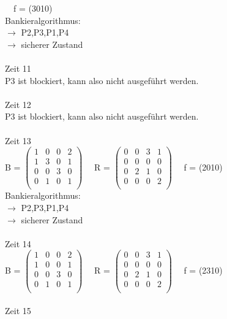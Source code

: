 \documentclass[10pt,a4paper]{scrartcl}
\begin{document}
	\ \ f = (3010)\\
	Bankieralgorithmus:\\
	$\rightarrow$ P2,P3,P1,P4\\
	$\rightarrow$ sicherer Zustand
	\\\\Zeit 11\\
	P3 ist blockiert, kann also nicht ausgeführt werden.
	\\\\Zeit 12\\
	P3 ist blockiert, kann also nicht ausgeführt werden.
	\\\\Zeit 13\\
	B =
	$\left( \begin{array}{rrrr}
	1 & 0 & 0 & 2 \\
	1 & 3 & 0 & 1 \\
	0 & 0 & 3 & 0 \\
	0 & 1 & 0 & 1 \\
	\end{array}\right) $
	\ \ R =
	$\left( \begin{array}{rrrr}
	0 & 0 & 3 & 1 \\
	0 & 0 & 0 & 0 \\
	0 & 2 & 1 & 0 \\
	0 & 0 & 0 & 2 \\
	\end{array}\right) $ 
	\ \ f = (2010)\\
	Bankieralgorithmus:\\
	$\rightarrow$ P2,P3,P1,P4\\
	$\rightarrow$ sicherer Zustand
	\\\\Zeit 14\\
	B =
	$\left( \begin{array}{rrrr}
	1 & 0 & 0 & 2 \\
	1 & 0 & 0 & 1 \\
	0 & 0 & 3 & 0 \\
	0 & 1 & 0 & 1 \\
	\end{array}\right) $
	\ \ R =
	$\left( \begin{array}{rrrr}
	0 & 0 & 3 & 1 \\
	0 & 0 & 0 & 0 \\
	0 & 2 & 1 & 0 \\
	0 & 0 & 0 & 2 \\
	\end{array}\right) $ 
	\ \ f = (2310)
	\\\\Zeit 15\\
\end{document}
